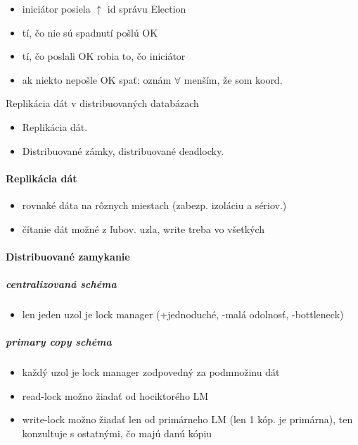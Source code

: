 \documentclass[a4paper]{report}
\begin{document}
\begin{itemize}
 \item iniciátor posiela $\uparrow$ id správu Election
 \item tí, čo nie sú spadnutí pošlú OK
 \item tí, čo poslali OK robia to, čo iniciátor
 \item ak niekto nepošle OK spať: oznám $\forall$ menším, že som koord.
\end{itemize}

\begin{zadanie}{Replikácia dát v distribuovaných databázach}
\begin{itemize}
 \item Replikácia dát.
 \item Distribuované zámky, distribuované deadlocky.
\end{itemize}
\end{zadanie}

\paragraph{Replikácia dát}
\begin{itemize}
 \item rovnaké dáta na rôznych miestach (zabezp. izoláciu a sériov.)
 \item čítanie dát možné z ľubov. uzla, write treba vo všetkých
\end{itemize}

\paragraph{Distribuované zamykanie}
\subparagraph*{centralizovaná schéma}
\begin{itemize}
 \item len jeden uzol je lock manager (+jednoduché, -malá odolnosť, -bottleneck)
\end{itemize}

\subparagraph*{primary copy schéma}
\begin{itemize}
 \item každý uzol je lock manager zodpovedný za podmnožinu dát
 \item read-lock možno žiadať od hociktorého LM
 \item write-lock možno žiadať len od primárneho LM (len 1 kóp. je primárna), ten konzultuje s ostatnými, čo majú danú kópiu
\end{itemize}
\end{document}
